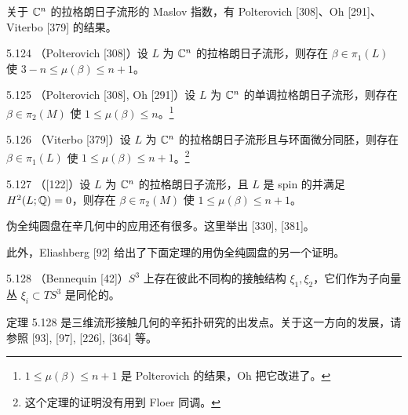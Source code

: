 关于 $\mathbb{C}^n$ 的拉格朗日子流形的 Maslov 指数，有 Polterovich [308]、Oh [291]、Viterbo [379] 的结果。

\begin{theorem}{5.124}
  （Polterovich [308]）设 $L$ 为 $\mathbb{C}^n$ 的拉格朗日子流形，则存在 $\beta\in\pi_1(L)$ 使 $3-n\le\mu(\beta)\le n+1$。
\end{theorem}

\begin{theorem}{5.125}
  （Polterovich [308], Oh [291]）设 $L$ 为 $\mathbb{C}^n$ 的单调拉格朗日子流形，则存在 $\beta\in\pi_2(M)$ 使 $1\le\mu(\beta)\le n$。\footnote{$1\le\mu(\beta)\le n+1$ 是 Polterovich 的结果，Oh 把它改进了。}
\end{theorem}

\begin{theorem}{5.126}
  （Viterbo [379]）设 $L$ 为 $\mathbb{C}^n$ 的拉格朗日子流形且与环面微分同胚，则存在 $\beta\in\pi_1(L)$ 使 $1\le\mu(\beta)\le n+1$。\footnote{这个定理的证明没有用到 Floer 同调。}
\end{theorem}

\begin{theorem}{5.127}
  （[122]）设 $L$ 为 $\mathbb{C}^n$ 的拉格朗日子流形，且 $L$ 是 spin 的并满足 $H^2(L;\mathbb{Q})=0$，则存在 $\beta\in\pi_2(M)$ 使 $1\le\mu(\beta)\le n+1$。
\end{theorem}

伪全纯圆盘在辛几何中的应用还有很多。这里举出 [330], [381]。

此外，Eliashberg [92] 给出了下面定理的用伪全纯圆盘的另一个证明。

\begin{theorem}{5.128}
  （Bennequin [42]）$S^3$ 上存在彼此不同构的接触结构 $\xi_1,\xi_2$，它们作为子向量丛 $\xi_i\subset TS^3$ 是同伦的。
\end{theorem}

定理 5.128 是三维流形接触几何的辛拓扑研究的出发点。关于这一方向的发展，请参照 [93], [97], [226], [364] 等。


